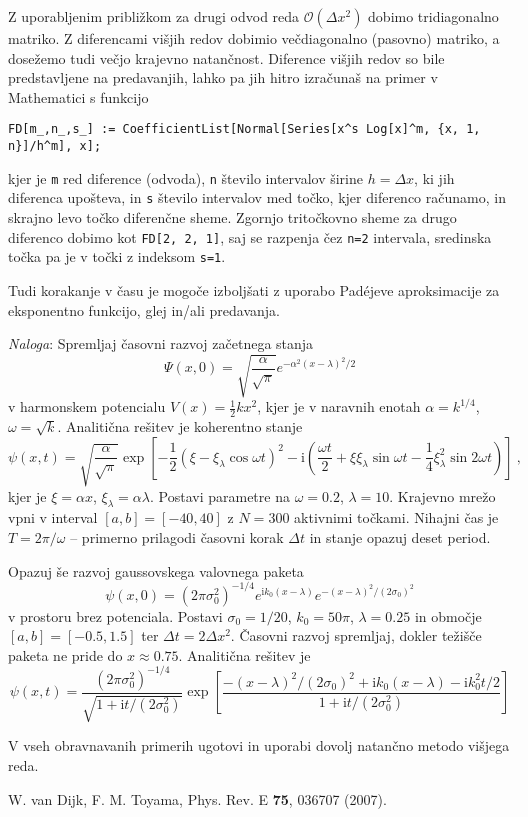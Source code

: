 \documentclass[slovene,11pt,a4paper]{article}
\newcommand{\ii}{\mathrm{i}}
\begin{document}
Z uporabljenim približkom za drugi odvod reda $\mathcal{O}(\Delta x^2)$ dobimo tridiagonalno matriko. Z diferencami višjih redov dobimio večdiagonalno (pasovno) matriko, a dosežemo tudi večjo krajevno natančnost. Diference višjih redov so bile predstavljene na predavanjih, lahko 
pa jih hitro izračunaš na primer v Mathematici s funkcijo
\begin{center}
  \tt FD[m_,n_,s_] := CoefficientList[Normal[Series[x\string^s Log[x]\string^m, \{x, 1, n\}]/h\string^m], x];
\end{center}
kjer je {\tt m} red diference (odvoda), {\tt n} število intervalov širine $h=\Delta x$, ki jih diferenca upošteva, in {\tt s} število intervalov med točko, kjer diferenco računamo, in skrajno levo točko diferenčne sheme. Zgornjo tritočkovno sheme za drugo diferenco dobimo kot {\tt FD[2, 2, 1]}, saj se razpenja čez {\tt n=2} intervala, sredinska točka pa je v točki z indeksom {\tt s=1}. 

Tudi korakanje v času je mogoče izboljšati z uporabo Pad\'ejeve aproksimacije za eksponentno funkcijo, glej \cite{dijk} in/ali predavanja. 


{\it Naloga\/}: Spremljaj časovni razvoj začetnega stanja
\begin{equation*}
  \Psi(x,0)=\sqrt{\frac{\alpha}{\sqrt{\pi}}} e^{-\alpha^2 (x-\lambda)^2/2}
\end{equation*}
v harmonskem potencialu $V(x)=\frac12 kx^2$, kjer je v naravnih enotah $\alpha=k^{1/4}$, $\omega=\sqrt{k}$. Analitična rešitev je koherentno stanje
\begin{equation*}
  \psi(x,t)=\sqrt{\frac{\alpha}{\sqrt{\pi}}} \exp\left[-\frac12 \left(\xi-\xi_\lambda \cos\omega t\right)^2 - \ii \left(\frac{\omega t}{2}+\xi\xi_\lambda \sin\omega t - \frac14 \xi_\lambda^2 \sin 2 \omega t\right)\right]\>,
\end{equation*}
kjer je $\xi=\alpha x$, $\xi_\lambda=\alpha \lambda$. Postavi parametre na $\omega=0.2$, $\lambda=10$. Krajevno mrežo vpni v interval $[a,b]=[-40,40]$ z $N=300$ aktivnimi točkami. Nihajni čas je $T=2\pi/\omega$ -- primerno prilagodi časovni korak $\Delta t$ in stanje opazuj deset period.

Opazuj še razvoj gaussovskega valovnega paketa
\begin{equation*}
  \psi(x,0)=(2\pi \sigma_0^2)^{-1/4} e^{\ii k_0(x-\lambda)}e^{-(x-\lambda)^2/(2\sigma_0)^2}
\end{equation*}
v prostoru brez potenciala. Postavi $\sigma_0=1/20$, $k_0=50\pi$, $\lambda=0.25$ in območje $[a,b]=[-0.5,1.5]$ ter $\Delta t=2\Delta x^2$. Časovni razvoj spremljaj, dokler težišče paketa ne pride do $x\approx 0.75$. Analitična rešitev je
\begin{equation*}
  \psi(x,t)=\frac{(2\pi \sigma_0^2)^{-1/4}}{\sqrt{1+\ii t/(2\sigma_0^2)}} \exp\left[
    \frac{-(x-\lambda)^2/(2\sigma_0)^2+\ii k_0(x-\lambda)-\ii k_0^2 t/2}{1+\ii t/(2\sigma_0^2)}
    \right]
\end{equation*}

V vseh obravnavanih primerih ugotovi in uporabi dovolj natančno metodo višjega reda.


\begin{thebibliography}{99}
\setlength{\itemsep}{.2\itemsep}\setlength{\parsep}{.5\parsep}
 W. van Dijk, F. M. Toyama, Phys. Rev. E {\bf 75}, 036707 (2007).
\end{thebibliography}

\end{document}
